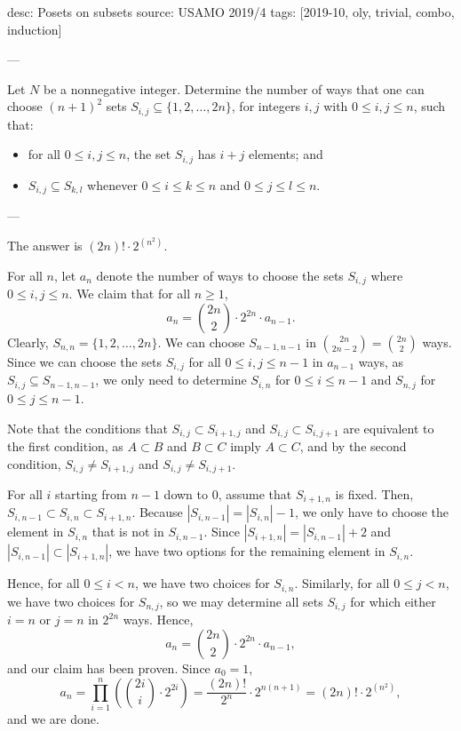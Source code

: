 desc: Posets on subsets
source: USAMO 2019/4
tags: [2019-10, oly, trivial, combo, induction]

---

Let $N$ be a nonnegative integer. Determine the number of ways that one can choose $(n+1)^2$ sets $S_{i,j}\subseteq\{1,2,\ldots,2n\}$, for integers $i,j$ with $0\le i,j\le n$, such that:
\begin{itemize}[itemsep=0em]
    \item for all $0\le i,j\le n$, the set $S_{i,j}$ has $i+j$ elements; and
    \item $S_{i,j}\subseteq S_{k,l}$ whenever $0\le i\le k\le n$ and $0\le j\le l\le n$.
\end{itemize}

---

The answer is $(2n)!\cdot 2^{(n^2)}$.

For all $n$, let $a_n$ denote the number of ways to choose the sets $S_{i,j}$ where $0\le i,j\le n$. We claim that for all $n\ge 1$, \[a_n=\binom{2n}2\cdot 2^{2n}\cdot a_{n-1}.\]
Clearly, $S_{n,n}=\{1,2,\ldots,2n\}$. We can choose $S_{n-1,n-1}$ in $\binom{2n}{2n-2}=\binom{2n}2$ ways. Since we can choose the sets $S_{i,j}$ for all $0\le i,j\le n-1$ in $a_{n-1}$ ways, as $S_{i,j}\subseteq S_{n-1,n-1}$, we only need to determine $S_{i,n}$ for $0\le i\le n-1$ and $S_{n,j}$ for $0\le j\le n-1$.

Note that the conditions that $S_{i,j}\subset S_{i+1,j}$ and $S_{i,j}\subset S_{i,j+1}$ are equivalent to the first condition, as $A\subset B$ and $B\subset C$ imply $A\subset C$, and by the second condition, $S_{i,j}\ne S_{i+1,j}$ and $S_{i,j}\ne S_{i,j+1}$.

For all $i$ starting from $n-1$ down to $0$, assume that $S_{i+1,n}$ is fixed. Then, $S_{i,n-1}\subset S_{i,n}\subset S_{i+1,n}$. Because $|S_{i,n-1}|=|S_{i,n}|-1$, we only have to choose the element in $S_{i,n}$ that is not in $S_{i,n-1}$. Since $|S_{i+1,n}|=|S_{i,n-1}|+2$ and $|S_{i,n-1}|\subset|S_{i+1,n}|$, we have two options for the remaining element in $S_{i,n}$.

Hence, for all $0\le i<n$, we have two choices for $S_{i,n}$. Similarly, for all $0\le j<n$, we have two choices for $S_{n,j}$, so we may determine all sets $S_{i,j}$ for which either $i=n$ or $j=n$ in $2^{2n}$ ways. Hence, \[a_n=\binom{2n}2\cdot 2^{2n}\cdot a_{n-1},\]
and our claim has been proven. Since $a_0=1$, \[a_n=\prod_{i=1}^n\left(\binom{2i}i\cdot 2^{2i}\right)=\frac{(2n)!}{2^n}\cdot 2^{n(n+1)}=(2n)!\cdot 2^{(n^2)},\]
and we are done.
